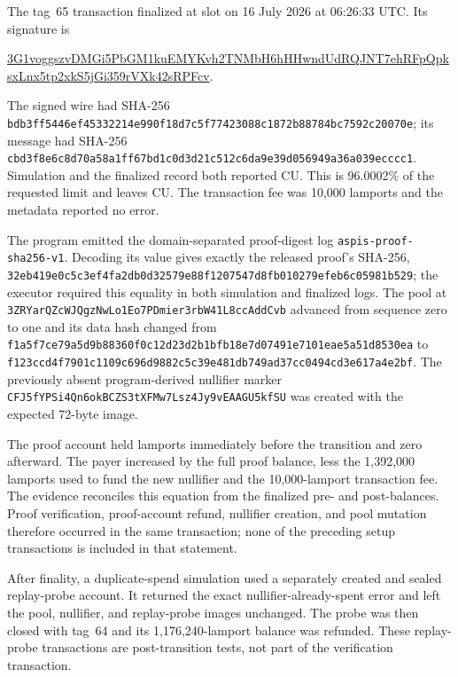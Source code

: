 The tag~65 transaction finalized at slot \ProfileMainnetSlot{} on 16 July
2026 at 06:26:33 UTC.  Its signature is
\begin{center}
  \scriptsize\ttfamily
  \href{https://explorer.solana.com/tx/3G1voggszvDMGi5PbGM1kuEMYKvh2TNMbH6hHHwndUdRQJNT7ehRFpQpksxLnx5tp2xkS5jGi359rVXk42sRPFcv?cluster=mainnet-beta}{3G1voggszvDMGi5PbGM1kuEMYKvh2TNMbH6hHHwndUdRQJNT7ehRFpQpksxLnx5tp2xkS5jGi359rVXk42sRPFcv}.
\end{center}
The signed wire had SHA-256
\nolinkurl{bdb3ff5446ef45332214e990f18d7c5f77423088c1872b88784bc7592c20070e};
its message had SHA-256
\nolinkurl{cbd3f8e6c8d70a58a1ff67bd1c0d3d21c512c6da9e39d056949a36a039ecccc1}.
Simulation and the finalized record both reported
\ProfileMainnetComputeUnits{} CU.  This is 96.0002\% of the requested limit
and leaves \ProfileMainnetComputeHeadroom{} CU.  The transaction fee was
10,000 lamports and the metadata reported no error.

The program emitted the domain-separated proof-digest log
\texttt{aspis-proof-sha256-v1}.  Decoding its value gives exactly the released
proof's SHA-256,
\nolinkurl{32eb419e0c5c3ef4fa2db0d32579e88f1207547d8fb010279efeb6c05981b529};
the executor required this equality in both simulation and finalized logs.  The pool at
\nolinkurl{3ZRYarQZcWJQgzNwLo1Eo7PDmier3rbW41L8ccAddCvb} advanced from sequence
zero to one and its data hash changed from
\nolinkurl{f1a5f7ce79a5d9b88360f0c12d23d2b1bfb18e7d07491e7101eae5a51d8530ea}
to
\nolinkurl{f123ccd4f7901c1109c696d9882c5c39e481db749ad37cc0494cd3e617a4e2bf}.
The previously absent program-derived nullifier marker
\nolinkurl{CFJ5fYPSi4Qn6okBCZS3tXFMw7Lsz4Jy9vEAAGU5kfSU} was created with the
expected 72-byte image.

The proof account held \ProfileProofRentLamports{} lamports immediately before
the transition and zero afterward.  The payer increased by the full proof
balance, less the 1,392,000 lamports used to fund the new nullifier and the
10,000-lamport transaction fee.  The evidence reconciles this equation from
the finalized pre- and post-balances.  Proof verification, proof-account
refund, nullifier creation, and pool mutation therefore occurred in the same
transaction; none of the preceding setup transactions is included in that
statement.

After finality, a duplicate-spend simulation used a separately created and
sealed replay-probe account.  It returned the exact nullifier-already-spent
error and left the pool, nullifier, and replay-probe images unchanged.  The
probe was then closed with tag~64 and its 1,176,240-lamport balance was
refunded.  These replay-probe transactions are post-transition tests, not part
of the verification transaction.

